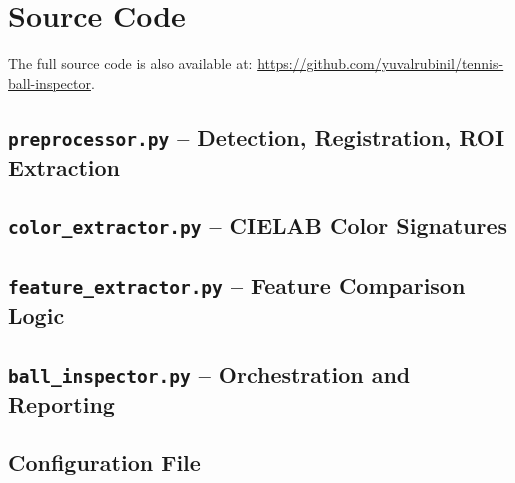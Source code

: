 \documentclass[11pt,a4paper]{article}
\begin{document}
\appendix
\newpage
\section{Source Code}

The full source code is also available at:
\url{https://github.com/yuvalrubinil/tennis-ball-inspector}.

\subsection{\texttt{preprocessor.py} -- Detection, Registration, ROI Extraction}


\newpage
\subsection{\texttt{color\_extractor.py} -- CIELAB Color Signatures}


\newpage
\subsection{\texttt{feature\_extractor.py} -- Feature Comparison Logic}


\newpage
\subsection{\texttt{ball\_inspector.py} -- Orchestration and Reporting}


\newpage
\subsection{Configuration File}

\end{document}
